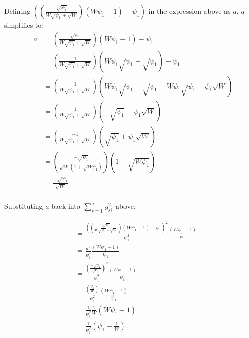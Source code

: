 Defining $\left(\left(\frac{\sqrt{\psi_1}}{W \sqrt{\psi_1} + \sqrt{W}}\right)(W \psi_1 - 1) - \psi_1\right)$ in the expression above as $a$, $a$ simplifies to:
\begin{equation}
    \begin{aligned}
    a &=\left(\frac{\sqrt{\psi_1}}{W \sqrt{\psi_1} + \sqrt{W}}\right) \left(W \psi_1 - 1 \right) - \psi_1 \\
     &=\left(\frac{1}{W \sqrt{\psi_1} + \sqrt{W}}\right)\left(W \psi_1\sqrt{\psi_1} - \sqrt{\psi_1}\right) - \psi_1 \\
     &=\left(\frac{1}{W \sqrt{\psi_1} + \sqrt{W}}\right)\left(W \psi_1\sqrt{\psi_1} - \sqrt{\psi_1} - W\psi_1\sqrt{\psi_1} - \psi_1\sqrt{W} \right) \\
     &=\left(\frac{1}{W \sqrt{\psi_1} + \sqrt{W}}\right)\left( - \sqrt{\psi_1}  - \psi_1\sqrt{W} \right) \\
     &=\left(\frac{-1}{W \sqrt{\psi_1} + \sqrt{W}}\right)\left( \sqrt{\psi_1}  + \psi_1\sqrt{W} \right) \\
     &=\left(\frac{-\sqrt{\psi_1}}{\sqrt{W} \left(1 + \sqrt{W\psi_1}\right) }\right)\left( 1  + \sqrt{W\psi_1} \right) \\
     &=\frac{-\sqrt{\psi_1}}{\sqrt{W}  } \\
    \end{aligned}
    \nonumber
\end{equation}

Substituting $a$ back into $\sum_{s=1}^q g_{s1}^2$ above:

\begin{equation}
    \begin{aligned}
        &= \frac{\left(\left( \frac{\sqrt{\psi_1}}{W \sqrt{\psi_1} + \sqrt{W}}\right)(W \psi_1 - 1) - \psi_1\right)^2}{\psi_1^2} \frac{(W \psi_1 - 1)}{\psi_1} \\
        &= \frac{a^2}{\psi_1^2} \frac{(W \psi_1 - 1)}{\psi_1} \\
        &= \frac{\left(\frac{-\sqrt{\psi_1}}{\sqrt{W}  }\right)^2}{\psi_1^2} \frac{(W \psi_1 - 1)}{\psi_1} \\
        &= \frac{\left(\frac{\psi_1}{W  }\right)}{\psi_1^2} \frac{(W \psi_1 - 1)}{\psi_1} \\
        &= \frac{1}{\psi_1^2}\frac{1}{W}  (W \psi_1 - 1) \\
        &= \frac{1}{\psi_1^2} \left(\psi_1 - \frac{1}{W}\right).
    \end{aligned}
    \nonumber
\end{equation}


